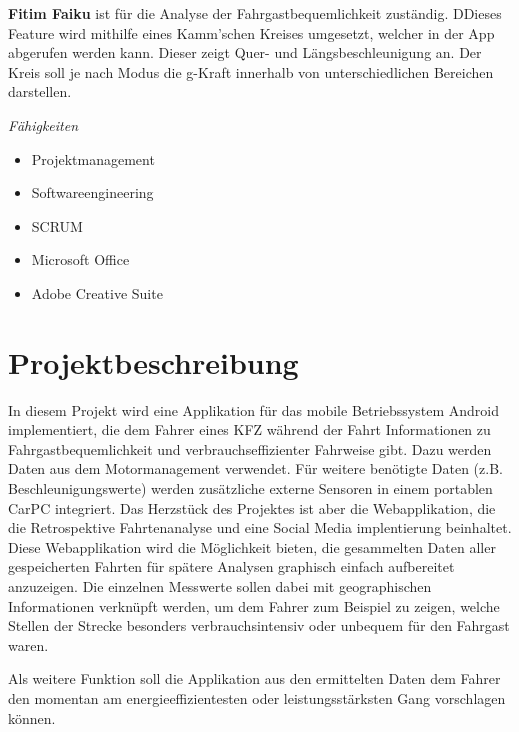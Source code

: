 \newpage

\textbf{Fitim Faiku} ist für die Analyse der Fahrgastbequemlichkeit zuständig. DDieses Feature wird mithilfe eines Kamm'schen Kreises umgesetzt, welcher in der App abgerufen werden kann. Dieser zeigt Quer- und Längsbeschleunigung an. Der Kreis soll je nach Modus die g-Kraft innerhalb von unterschiedlichen Bereichen darstellen. 

\textit{Fähigkeiten}
\begin{itemize}
	\item Projektmanagement			
	\item Softwareengineering
	\item SCRUM
	\item Microsoft Office
	\item Adobe Creative Suite
\end{itemize}


\section{Projektbeschreibung}
In diesem Projekt wird eine Applikation für das mobile Betriebssystem Android implementiert, 
die dem Fahrer eines KFZ während der Fahrt Informationen zu Fahrgastbequemlichkeit und verbrauchseffizienter Fahrweise gibt. 
Dazu werden Daten aus dem Motormanagement verwendet. 
Für weitere benötigte Daten (z.B. Beschleunigungswerte) werden zusätzliche externe Sensoren in einem portablen CarPC integriert. 
Das Herzstück des Projektes ist aber die Webapplikation, die die Retrospektive Fahrtenanalyse und eine Social Media implentierung beinhaltet.
Diese Webapplikation wird die Möglichkeit bieten, die gesammelten Daten aller gespeicherten 
Fahrten für spätere Analysen graphisch einfach aufbereitet anzuzeigen. 
Die einzelnen Messwerte sollen dabei mit geographischen Informationen verknüpft werden, 
um dem Fahrer zum Beispiel zu zeigen, welche Stellen der Strecke besonders verbrauchsintensiv oder unbequem für den Fahrgast waren. 

Als weitere Funktion soll die Applikation aus den ermittelten Daten dem Fahrer den 
momentan am energieeffizientesten oder leistungsstärksten Gang vorschlagen können.
